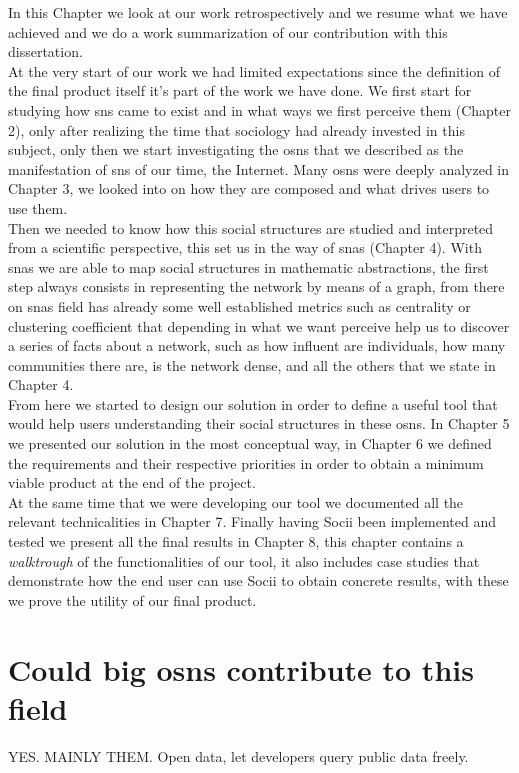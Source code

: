 In this Chapter we look at our work retrospectively and we resume what we have achieved and we do a work summarization of our contribution with this
dissertation.\\
\indent At the very start of our work we had limited expectations since the definition of the final product itself it's part of the work we have done. We first start for studying how \glspl{sn} came to exist and in what ways we first perceive them (Chapter 2), only after realizing the time that sociology had already invested in this subject, only then we start investigating the \glspl{osn} that we described as the manifestation of \glspl{sn} of our time, the Internet. Many \glspl{osn} were deeply analyzed in Chapter 3, we looked into on how they are composed and what drives users to use them.\\
\indent Then we needed to know how this social structures are studied and interpreted from a scientific perspective, this set us in the way of \glspl{sna} (Chapter 4). With \glspl{sna} we are able to map social structures in mathematic abstractions, the first step always consists in representing the network by means of a graph, from there on \glspl{sna} field has already some well established metrics such as centrality or clustering coefficient that depending in what we want perceive help us to discover a series of facts about a network, such as how influent are individuals, how many communities there are, is the network dense, and all the others that we state in Chapter 4.\\
\indent From here we started to design our solution in order to define a useful tool that would help users understanding their social structures in these \glspl{osn}. In Chapter 5 we presented our solution in the most conceptual way, in Chapter 6 we defined the requirements and their respective priorities in order to obtain a minimum viable product at the end of the project.\\
\indent At the same time that we were developing our tool we documented all the relevant technicalities in Chapter 7. Finally having Socii been implemented and tested we present all the final results in Chapter 8, this chapter contains a \textit{walktrough} of the functionalities of our tool, it also includes case studies that demonstrate how the end user can use Socii to obtain concrete results, with these we prove the utility of our final product.

\section{Could big \glspl{osn} contribute to this field}
YES. MAINLY THEM. Open data, let developers query public data freely.

